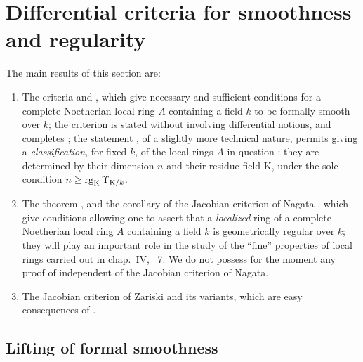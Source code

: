\section{Differential criteria for smoothness and regularity}
\label{section:0.22}

The main results of this section are:
\begin{enumerate}
  \item[a)] The criteria  and , which give necessary and sufficient conditions for a complete Noetherian local ring $A$ containing a field $k$ to be formally smooth over $k$; the criterion  is stated without involving differential notions, and completes ; the statement , of a slightly more technical nature, permits giving a \emph{classification}, for fixed $k$, of the local rings $A$ in question : they are determined by their dimension $n$ and their residue field $\mathrm{K}$, under the sole condition $n\geq\operatorname{rg}_\mathrm{K}\Upsilon_{\mathrm{K}/k}$.
  \item[b)] The theorem , and the corollary  of the Jacobian criterion of Nagata , which give conditions allowing one to assert that a \emph{localized} ring of a complete Noetherian local ring $A$ containing a field $k$ is geometrically regular over $k$; they will play an important role in the study of the ``fine'' properties of local rings carried out in chap.~IV, \textsection~7. We do not possess for the moment any proof of  independent of the Jacobian criterion of Nagata.
  \item[c)] The Jacobian criterion of Zariski  and its variants, which are easy consequences of .
\end{enumerate}

\subsection{Lifting of formal smoothness}
\label{subsection:0.22.1}

